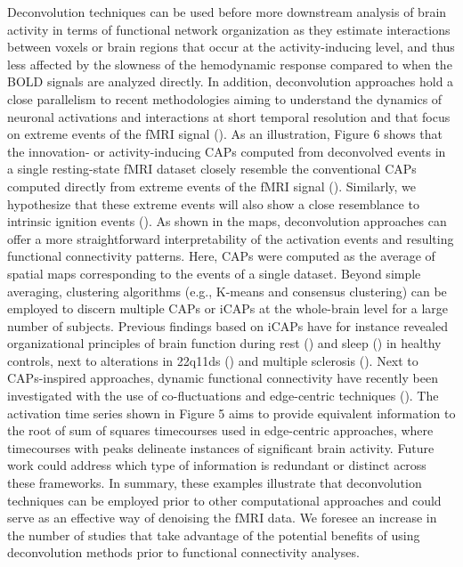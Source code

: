 Deconvolution techniques can be used before more downstream analysis of brain activity in terms of functional network organization as they estimate interactions between voxels or brain regions that occur at the activity-inducing level, and thus less affected by the slowness of the hemodynamic response compared to when the BOLD signals are analyzed directly. In addition, deconvolution approaches hold a close parallelism to recent methodologies aiming to understand the dynamics of neuronal activations and interactions at short temporal resolution and that focus on extreme events of the fMRI signal (\citealt{Lindquist_2007}). As an illustration, Figure 6 shows that the innovation- or activity-inducing CAPs computed from deconvolved events in a single resting-state fMRI dataset closely resemble the conventional CAPs computed directly from extreme events of the fMRI signal (\citealt{Liu2013Timevaryingfunctional,Liu2013Decompositionspontaneousbrain,Liu2018Coactivationpatterns,cifre2020revisiting,Cifre2020Furtherresultswhy,Zhang2020relationshipBOLDneural,Tagliazucchi2011,Tagliazucchi2012,Tagliazucchi2016,Rolls2021}). Similarly, we hypothesize that these extreme events will also show a close resemblance to intrinsic ignition events (\citealt{Deco2017a,Deco2017}). As shown in the maps, deconvolution approaches can offer a more straightforward interpretability of the activation events and resulting functional connectivity patterns. Here, CAPs were computed as the average of spatial maps corresponding to the events of a single dataset. Beyond simple averaging, clustering algorithms (e.g., K-means and consensus clustering) can be employed to discern multiple CAPs or iCAPs at the whole-brain level for a large number of subjects. Previous findings based on iCAPs have for instance revealed organizational principles of brain function during rest (\citealt{Karahanoglu2015Transientbrainactivity}) and sleep (\citealt{tarun2101}) in healthy controls, next to alterations in 22q11ds (\citealt{zoller1902}) and multiple sclerosis (\citealt{bommarito2101p}). Next to CAPs-inspired approaches, dynamic functional connectivity have recently been investigated with the use of co-fluctuations and edge-centric techniques (\citealt{Faskowitz2020,Esfahlani2020Highamplitudecofluctuations,Jo2021,Sporns2021,Oort2018}). The activation time series shown in Figure 5 aims to provide equivalent information to the root of sum of squares timecourses used in edge-centric approaches, where timecourses with peaks delineate instances of significant brain activity. Future work could address which type of information is redundant or distinct across these frameworks. In summary, these examples illustrate that deconvolution techniques can be employed prior to other computational approaches and could serve as an effective way of denoising the fMRI data. We foresee an increase in the number of studies that take advantage of the potential benefits of using deconvolution methods prior to functional connectivity analyses.

